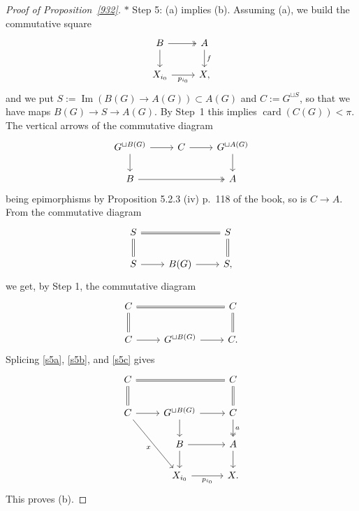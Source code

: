 \documentclass[12pt]{article}
\theoremstyle{remark}
\theoremstyle{definition}
\newcommand{\nn}{\noindent}
\DeclareMathOperator{\card}{card}
\DeclareMathOperator{\Ima}{Im}
\begin{document}
\begin{proof}[Proof of Proposition~\ref{932}]
\nn$*$ Step 5: (a) implies (b). Assuming (a), we build the commutative square 
%
\begin{equation}\label{s5a}
\begin{tikzcd}
B\ar[two heads]{r}\ar{d}&A\ar{d}{f}\\ 
X_{i_0}\ar{r}[swap]{p_{i_0}}&X,
\end{tikzcd}
\end{equation}
% 
and we put $S:=\Ima(B(G)\to A(G))\subset A(G)$ and $C:=G^{\sqcup S}$, so that we have maps $B(G)\to S\to A(G)$. By Step~1 this implies $\card(C(G))<\pi$. The vertical arrows of the commutative diagram 
%
\begin{equation}\label{s5b}
\begin{tikzcd}
G^{\sqcup B(G)}\ar{r}\ar{d}&C\ar{r}&G^{\sqcup A(G)}\ar{d}\\ 
B\ar[two heads]{rr}&&A
\end{tikzcd}
\end{equation} 
%
being epimorphisms by Proposition 5.2.3 (iv) p.~118 of the book, so is $C\to A$. From the commutative diagram 
$$
\begin{tikzcd}
S\ar[equal]{rr}\ar[equal]{d}&&S\ar[equal]{d}\\ 
S\ar{r}&B(G)\ar{r}&S,
\end{tikzcd}
$$ 
we get, by Step 1, the commutative diagram 
%
\begin{equation}\label{s5c}
\begin{tikzcd}
C\ar[equal]{rr}\ar[equal]{d}&&C\ar[equal]{d}\\ 
C\ar{r}&G^{\sqcup B(G)}\ar{r}&C.
\end{tikzcd}
\end{equation} 
%
Splicing \eqref{s5a}, \eqref{s5b}, and \eqref{s5c} gives 
$$
\begin{tikzcd}
C\ar[equal]{rr}\ar[equal]{d}&&C\ar[equal]{d}\\ 
C\ar{r}\ar{rdd}[swap]{x}&G^{\sqcup B(G)}\ar{r}\ar{d}&C\ar[two heads]{d}{a}\\ 
{}&B\ar{r}\ar{d}&A\ar{d}\\ 
{}&X_{i_0}\ar{r}[swap]{p_{i_0}}&X.
\end{tikzcd}
$$ 
This proves (b).


\end{proof}
\end{document}
